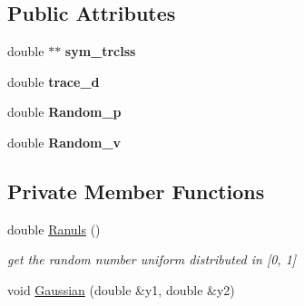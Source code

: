 \subsection*{Public Attributes}
\begin{CompactItemize}
\item 
\hypertarget{classWiener_cd79f000952f14b816c3cdd008c34a2a}{
double $\ast$$\ast$ \textbf{sym\_\-trclss}}
\label{classWiener_cd79f000952f14b816c3cdd008c34a2a}

\item 
\hypertarget{classWiener_c24cf9f8fd8385325584c190f93f0abe}{
double \textbf{trace\_\-d}}
\label{classWiener_c24cf9f8fd8385325584c190f93f0abe}

\item 
\hypertarget{classWiener_f47c4ccdb5cc42751beaf9023e64d426}{
double \textbf{Random\_\-p}}
\label{classWiener_f47c4ccdb5cc42751beaf9023e64d426}

\item 
\hypertarget{classWiener_411516a928b7d38aa170c2311af6c26a}{
double \textbf{Random\_\-v}}
\label{classWiener_411516a928b7d38aa170c2311af6c26a}

\end{CompactItemize}
\subsection*{Private Member Functions}
\begin{CompactItemize}
\item 
\hypertarget{classWiener_238e64201f993e2e4fff5c6615b1cf85}{
double \hyperlink{classWiener_238e64201f993e2e4fff5c6615b1cf85}{Ranuls} ()}
\label{classWiener_238e64201f993e2e4fff5c6615b1cf85}

\begin{CompactList}\small\item\em get the random number uniform distributed in \mbox{[}0, 1\mbox{]} \item\end{CompactList}\item 
void \hyperlink{classWiener_afdd7d1aa80e1609edd7bcc7532d56d6}{Gaussian} (double \&y1, double \&y2)
\end{CompactItemize}
